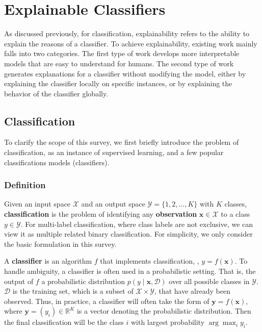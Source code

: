 \chapter{Explainable Classifiers}\label{sec-explainable-classifier}

As discussed previously, for classification, explainability refers to the ability to explain the reasons of a classifier. To achieve explainability, existing work mainly falls into two categories. The first type of work develops more interpretable models that are easy to understand for humans. The second type of work generates explanations for a classifier without modifying the model, either by explaining the classifier locally on specific instances, or by explaining the behavior of the classifier globally.

\section{Classification}

To clarify the scope of this survey, we first briefly introduce the problem of classification, as an instance of supervised learning, and a few popular classifications models (classifiers). 


\subsection{Definition}

Given an input space $\mathcal{X}$ and an output space $\mathcal{Y}=\{1, 2, ..., K\}$ with $K$ classes, \textbf{classification} is the problem of identifying any \textbf{observation} $\mathbf{x}\in\mathcal{X}$ to a class $y\in\mathcal{Y}$. For multi-label classification, where class labels are not exclusive, we can view it as multiple related binary classification. For simplicity, we only consider the basic formulation in this survey. 

A \textbf{classifier} is an algorithm $f$ that implements classification, \ie, $y = f(\mathbf{x})$. To handle ambiguity, a classifier is often used in a probabilistic setting. That is, the output of $f$ a probabilistic distribution $p(y\mid \mathbf{x}, \mathcal{D})$ over all possible classes in $\mathcal{Y}$. $\mathcal{D}$ is the training set, which is a subset of $\mathcal{X}\times\mathcal{Y}$, that have already been observed. Thus, in practice, a classifier will often take the form of $\mathbf{y} = f(\mathbf{x})$, where $\mathbf{y}=(y_i)\in\mathbb{R}^K$ is a vector denoting the probabilistic distribution. Then the final classification will be the class $i$ with largest probability $\arg\max_{i}{y_i}$.

